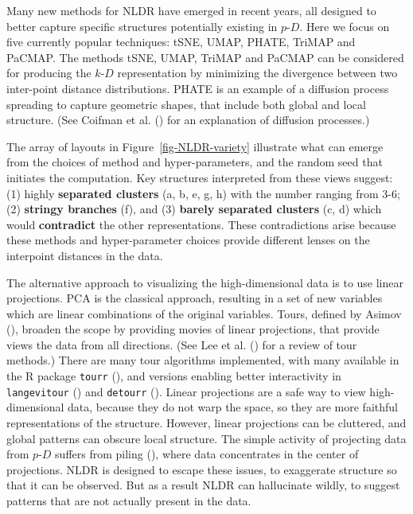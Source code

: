 \documentclass[
  11pt,
  a4paper,
]{report}
\newcommand\pD{$p\text{-}D$}
\newcommand\kD{$k\text{-}D$}
\begin{document}
Many new methods for NLDR have emerged in recent years, all designed to
better capture specific structures potentially existing in \pD{}. Here
we focus on five currently popular techniques: tSNE, UMAP, PHATE, TriMAP
and PaCMAP. The methods tSNE, UMAP, TriMAP and PaCMAP can be considered
for producing the \kD{} representation by minimizing the divergence
between two inter-point distance distributions. PHATE is an example of a
diffusion process spreading to capture geometric shapes, that include
both global and local structure. (See Coifman et al.
() for an explanation of diffusion
processes.)

The array of layouts in Figure~\ref{fig-NLDR-variety} illustrate what
can emerge from the choices of method and hyper-parameters, and the
random seed that initiates the computation. Key structures interpreted
from these views suggest: (1) highly \textbf{separated clusters} (a, b,
e, g, h) with the number ranging from 3-6; (2) \textbf{stringy branches}
(f), and (3) \textbf{barely separated clusters} (c, d) which would
\textbf{contradict} the other representations. These contradictions
arise because these methods and hyper-parameter choices provide
different lenses on the interpoint distances in the data.

The alternative approach to visualizing the high-dimensional data is to
use linear projections. PCA is the classical approach, resulting in a
set of new variables which are linear combinations of the original
variables. Tours, defined by Asimov (), broaden
the scope by providing movies of linear projections, that provide views
the data from all directions. (See Lee et al.
() for a review of tour methods.) There are
many tour algorithms implemented, with many available in the R package
\texttt{tourr} (), and
versions enabling better interactivity in \texttt{langevitour}
() and \texttt{detourr}
(). Linear projections are a
safe way to view high-dimensional data, because they do not warp the
space, so they are more faithful representations of the structure.
However, linear projections can be cluttered, and global patterns can
obscure local structure. The simple activity of projecting data from
\pD{} suffers from piling (),
where data concentrates in the center of projections. NLDR is designed
to escape these issues, to exaggerate structure so that it can be
observed. But as a result NLDR can hallucinate wildly, to suggest
patterns that are not actually present in the data.
\end{document}
